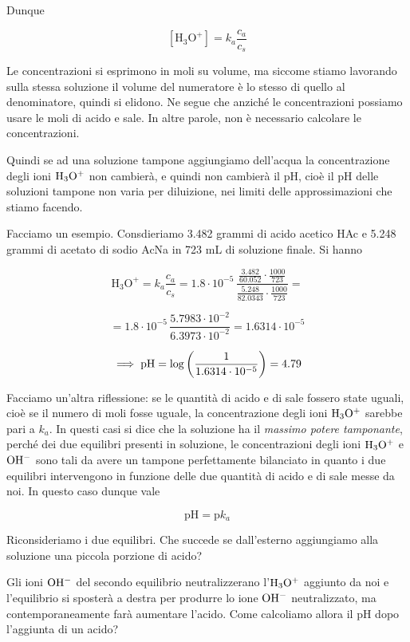 Dunque

$$[\text{H}_3\text{O}^+] = k_a \frac{c_a}{c_s}$$

Le concentrazioni si esprimono in moli su volume, ma siccome stiamo lavorando sulla stessa soluzione il volume del numeratore è lo stesso di quello al denominatore, quindi si elidono. Ne segue che anziché le concentrazioni possiamo usare le moli di acido e sale. In altre parole, non è necessario calcolare le concentrazioni.

Quindi se ad una soluzione tampone aggiungiamo dell'acqua la concentrazione degli ioni $\rm H_3O^+$ non cambierà, e quindi non cambierà il pH, cioè il pH delle soluzioni tampone non varia per diluizione, nei limiti delle approssimazioni che stiamo facendo.

\vspace{0.2cm}Facciamo un esempio. Consdieriamo 3.482 grammi di acido acetico HAc e 5.248 grammi di acetato di sodio AcNa in 723 mL di soluzione finale. Si hanno

$$\text{H}_3\text{O}^+=k_a\frac{c_a}{c_s}
=1.8 \cdot 10^{-5}\,\frac{\frac{3.482}{60.052} \cdot \frac{1000}{723}}{\frac{5.248}{82.0343} \cdot \frac{1000}{723}}=$$

$$=1.8 \cdot 10^{-5}\,\frac{5.7983\cdot 10^{-2}}{6.3973\cdot 10^{-2}}=1.6314\cdot 10^{-5}$$

$$\implies \rm pH=\log\left( \frac{1}{1.6314\cdot 10^{-5}} \right)=4.79$$

Facciamo un'altra riflessione: se le quantità di acido e di sale fossero state uguali, cioè se il numero di moli fosse uguale, la concentrazione degli ioni $\rm H_3O^+$ sarebbe pari a $k_a$. In questi casi si dice che la soluzione ha il \textit{massimo potere tamponante}, perché dei due equilibri presenti in soluzione, le concentrazioni degli ioni $\rm H_3O^+$ e $\rm OH^-$ sono tali da avere un tampone perfettamente bilanciato in quanto i due equilibri intervengono in funzione delle due quantità di acido e di sale messe da noi. In questo caso dunque vale

$$\text{pH}=\text{p}k_a$$

Riconsideriamo i due equilibri. Che succede se dall'esterno aggiungiamo alla soluzione una piccola porzione di acido?

Gli ioni $\rm OH^-$ del secondo equilibrio neutralizzerano l'$\rm H_3O^+$ aggiunto da noi e l'equilibrio si sposterà a destra per produrre lo ione $\rm OH^-$ neutralizzato, ma contemporaneamente farà aumentare l'acido. Come calcoliamo allora il pH dopo l'aggiunta di un acido?

